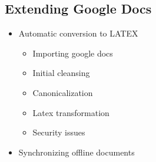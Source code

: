 \subsection{Extending Google Docs}\cite{2006}
\begin{itemize}
   \item Automatic conversion to LATEX
  \begin{itemize}
   
  \item Importing google docs
  \item Initial cleansing
  \item Canonicalization
  \item Latex transformation
  \item Security issues
   \end{itemize}

  \item Synchronizing offline documents
\end{itemize}






